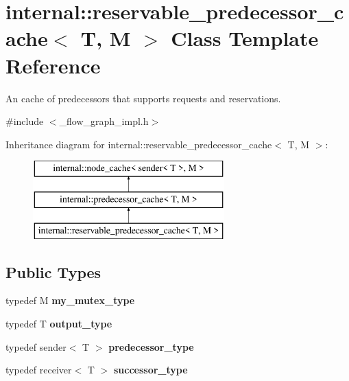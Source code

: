 \hypertarget{classinternal_1_1reservable__predecessor__cache}{}\section{internal\+:\+:reservable\+\_\+predecessor\+\_\+cache$<$ T, M $>$ Class Template Reference}
\label{classinternal_1_1reservable__predecessor__cache}


An cache of predecessors that supports requests and reservations.  




{\ttfamily \#include $<$\+\_\+flow\+\_\+graph\+\_\+impl.\+h$>$}

Inheritance diagram for internal\+:\+:reservable\+\_\+predecessor\+\_\+cache$<$ T, M $>$\+:\begin{figure}[H]
\begin{center}
\leavevmode
\includegraphics[height=3.000000cm]{classinternal_1_1reservable__predecessor__cache}
\end{center}
\end{figure}
\subsection*{Public Types}
\begin{DoxyCompactItemize}
\item 
\hypertarget{classinternal_1_1reservable__predecessor__cache_a93da9961eed8d6897bf2a3e31f0ab64a}{}typedef M {\bfseries my\+\_\+mutex\+\_\+type}\label{classinternal_1_1reservable__predecessor__cache_a93da9961eed8d6897bf2a3e31f0ab64a}

\item 
\hypertarget{classinternal_1_1reservable__predecessor__cache_a93e9b1594173e6d9e6f3cdd8ccc926ce}{}typedef T {\bfseries output\+\_\+type}\label{classinternal_1_1reservable__predecessor__cache_a93e9b1594173e6d9e6f3cdd8ccc926ce}

\item 
\hypertarget{classinternal_1_1reservable__predecessor__cache_a6f2202c13e4f7bdc66d446026ce4e6a7}{}typedef sender$<$ T $>$ {\bfseries predecessor\+\_\+type}\label{classinternal_1_1reservable__predecessor__cache_a6f2202c13e4f7bdc66d446026ce4e6a7}

\item 
\hypertarget{classinternal_1_1reservable__predecessor__cache_a14e5c337117f573557b1c76ba2a29d7d}{}typedef receiver$<$ T $>$ {\bfseries successor\+\_\+type}\label{classinternal_1_1reservable__predecessor__cache_a14e5c337117f573557b1c76ba2a29d7d}

\end{DoxyCompactItemize}
